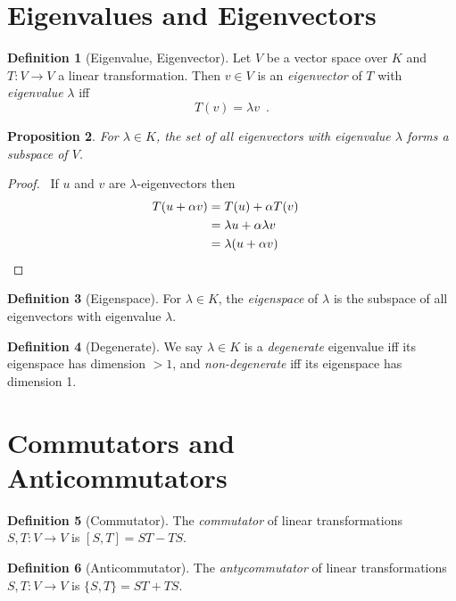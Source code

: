 \documentclass{book}
\let\qed\relax
\newtheorem{prop}{Proposition}[chapter]
\theoremstyle{definition}
\newtheorem{df}[prop]{Definition}
\begin{document}
\section{Eigenvalues and Eigenvectors}

\begin{df}[Eigenvalue, Eigenvector]
Let $V$ be a vector space over $K$ and $T : V \rightarrow V$ a linear transformation. Then $v \in V$ is an \emph{eigenvector} of $T$ with \emph{eigenvalue} $\lambda$ iff
\[ T(v) = \lambda v \enspace . \]
\end{df}

\begin{prop}
For $\lambda \in K$, the set of all eigenvectors with eigenvalue $\lambda$ forms a subspace of $V$.
\end{prop}

\begin{proof}
\pf\ If $u$ and $v$ are $\lambda$-eigenvectors then
\begin{align*}
T(u + \alpha v) & = T(u) + \alpha T(v) \\
& = \lambda u + \alpha \lambda v \\
& = \lambda (u + \alpha v) & \qed
\end{align*}
\end{proof}

\begin{df}[Eigenspace]
For $\lambda \in K$, the \emph{eigenspace} of $\lambda$ is the subspace of all eigenvectors with eigenvalue $\lambda$.
\end{df}

\begin{df}[Degenerate]
We say $\lambda \in K$ is a \emph{degenerate} eigenvalue iff its eigenspace has dimension $> 1$, and \emph{non-degenerate} iff its eigenspace has dimension 1.
\end{df}

\section{Commutators and Anticommutators}

\begin{df}[Commutator]
The \emph{commutator} of linear transformations $S,T : V \rightarrow V$ is $[S,T] = ST - TS$.
\end{df}

\begin{df}[Anticommutator]
The \emph{antycommutator} of linear transformations $S,T : V \rightarrow V$ is $\{ S,T \} = ST + TS$.
\end{df}
\end{document}

